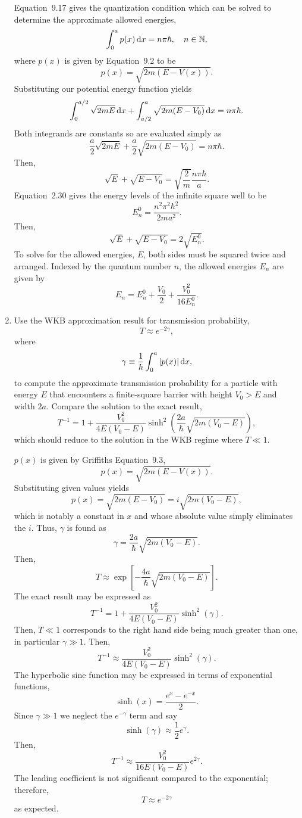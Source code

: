 \documentclass[a4paper, 12pt]{config/homework}
\begin{document}
\begin{enumerate}
\bigskip
Equation~9.17 gives the quantization condition which can be solved to determine the approximate allowed energies,
\[\int_{0}^{a}{p(x) \, \text{d}x}=n\pi\hbar, \quad n\in\mathbb{N},\]
where \(p(x)\) is given by Equation~9.2 to be
\[p(x) = \sqrt{2m\left(E-V(x)\right)}.\]
Substituting our potential energy function yields
\[\int_{0}^{a/2}{\sqrt{2mE} \, \text{d}x} + \int_{a/2}^{a}{\sqrt{2m(E-V_0)} \, \text{d}x} = n\pi\hbar.\]
Both integrands are constants so are evaluated simply as
\[\frac{a}{2}\sqrt{2mE} + \frac{a}{2}\sqrt{2m(E-V_0)} = n\pi\hbar.\]
Then,
\[\sqrt{E} + \sqrt{E-V_0} = \sqrt{\frac{2}{m}}\frac{n\pi\hbar}{a}.\]
Equation~2.30 gives the energy levels of the infinite square well to be
\[E_n^0 = \frac{n^2\pi^2\hbar^2}{2ma^2}.\]
Then,
\[\sqrt{E}+\sqrt{E-V_0} = 2\sqrt{E_n^0}.\]
To solve for the allowed energies, \(E\), both sides must be squared twice and arranged. Indexed by the quantum number \(n\), the allowed energies \(E_n\) are given by
\[E_n = E_n^0 + \frac{V_0}{2} + \frac{V_0^2}{16 E_n^0}.\]


\pagebreak
\item Use the WKB approximation result for transmission probability,
\[T \approx e^{-2\gamma},\]
where
\[\gamma \equiv \frac{1}{\hbar}\int_{0}^{a}{|p(x)| \, \text{d}x},\]
to compute the approximate transmission probability for a particle with energy \(E\) that encounters a finite-square barrier with height \(V_0 > E\) and width \(2a\). Compare the solution to the exact result,
\[T^{-1} = 1 + \frac{V_0^2}{4E(V_0-E)}\sinh^2\left(\frac{2a}{\hbar}\sqrt{2m(V_0-E)}\right),\]
which should reduce to the solution in the WKB regime where \(T\ll 1\).

\bigskip
\(p(x)\) is given by Griffiths Equation~9.3,
\[p(x) = \sqrt{2m(E-V(x))}.\]
Substituting given values yields
\[p(x) = \sqrt{2m(E-V_0)} = i\sqrt{2m(V_0-E)},\]
which is notably a constant in \(x\) and whose absolute value simply eliminates the \(i\). Thus, \(\gamma\) is found as
\[\gamma = \frac{2a}{\hbar}\sqrt{2m(V_0-E)}.\]
Then,
\[T \approx \exp\left[-\frac{4a}{\hbar}\sqrt{2m(V_0-E)}\right].\]
The exact result may be expressed as
\[T^{-1} = 1 + \frac{V_0^2}{4E(V_0-E)}\sinh^2\left(\gamma\right).\]
Then, \(T \ll 1\) corresponds to the right hand side being much greater than one, in particular \(\gamma \gg 1\). Then,
\[T^{-1} \approx \frac{V_0^2}{4E(V_0-E)}\sinh^2(\gamma).\]
The hyperbolic sine function may be expressed in terms of exponential functions,
\[\sinh(x) = \frac{e^x - e^{-x}}{2}.\]
Since \(\gamma\gg 1\) we neglect the \(e^{-\gamma}\) term and say
\[\sinh(\gamma) \approx \frac{1}{2}e^{\gamma}.\]
Then,
\[T^{-1} \approx \frac{V_0^2}{16E(V_0-E)}e^{2\gamma}.\]
The leading coefficient is not significant compared to the exponential; therefore,
\[T \approx e^{-2\gamma}\]
as expected.

\end{enumerate}
\end{document}
